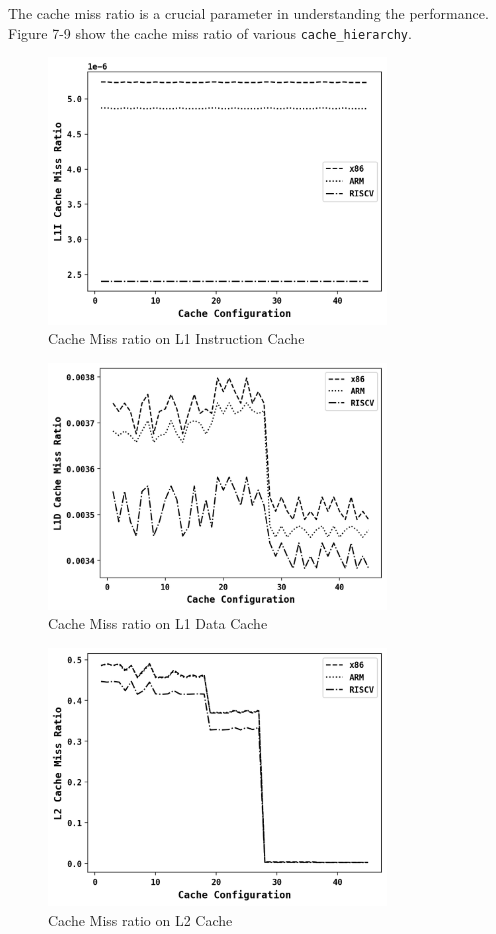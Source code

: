 The cache miss ratio is a crucial parameter in understanding the performance. Figure 7-9 show the cache miss
ratio of various \texttt{cache\_hierarchy}.
\begin{figure}[H]
    \centering
    \includegraphics[width=0.8\textwidth]{./figs/8.png}
    \caption{Cache Miss ratio on L1 Instruction Cache}
    \label{fig:Cache Miss ratio on L1 Instruction Cache}
\end{figure}
\begin{figure}[H]
    \centering
    \includegraphics[width=0.8\textwidth]{./figs/7.png}
    \caption{Cache Miss ratio on L1 Data Cache}
    \label{fig:Cache Miss ratio on L1 Data Cache}
\end{figure}
\begin{figure}[H]
    \centering
    \includegraphics[width=0.8\textwidth]{./figs/9.png}
    \caption{Cache Miss ratio on L2 Cache}
    \label{fig:Cache Miss ratio on L2 Cache}
\end{figure}
